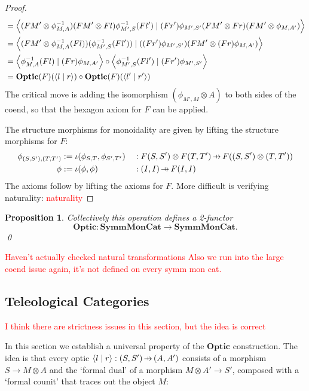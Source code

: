 \documentclass[11pt,letterpaper]{article}
\theoremstyle{plain}
\newtheorem{proposition}[theorem]{Proposition}
\theoremstyle{definition}
\newcommand{\SymmMonCat}{\mathbf{SymmMonCat}}
\newcommand{\Optic}{\mathbf{Optic}}
\newcommand{\rep}[2]{{\ensuremath \left\langle #1 \mid #2 \right\rangle}}
\newcommand{\hto}{\ensuremath{\,\mathaccent\shortmid\rightarrow\,}}
\newcommand{\todo}[1]{\textcolor{red}{\small #1}}
\begin{document}
\begin{proof}
\begin{align*}
&= \rep{(FM' \otimes \phi^{-1}_{M,A})(FM' \otimes Fl)\phi^{-1}_{M',S} (Fl')}{(Fr') \phi_{M',S'} (FM' \otimes Fr) (FM' \otimes \phi_{M,A'})} \\
&= \rep{(FM' \otimes \phi^{-1}_{M,A} (Fl))(\phi^{-1}_{M',S} (Fl'))}{((Fr') \phi_{M',S'})(FM' \otimes (Fr) \phi_{M,A'})} \\
&= \rep{\phi^{-1}_{M,A} (Fl)}{(Fr) \phi_{M,A'}} \circ \rep{\phi^{-1}_{M',S} (Fl')}{(Fr') \phi_{M',S'}} \\
&= \Optic(F)(\rep{l}{r}) \circ \Optic(F)(\rep{l'}{r'})
\end{align*}
The critical move is adding the isomorphism $(\phi_{M', M} \otimes A)$ to both sides of the coend, so that the hexagon axiom for $F$ can be applied.

The structure morphisms for monoidality are given by lifting the structure morphisms for $F$:
\begin{align*}
\phi_{(S, S'), (T, T')} &:= \iota(\phi_{S, T}, \phi_{S', T'}) &&: F(S, S') \otimes F(T, T') \hto F((S, S') \otimes (T, T')) \\
\phi &:= \iota(\phi, \phi) &&: (I, I) \hto F(I, I)
\end{align*}
The axioms follow by lifting the axioms for $F$. More difficult is verifying naturality: \todo{naturality}
\end{proof}

\begin{proposition}\label{prop:optic-functor}
  Collectively this operation defines a 2-functor \[\Optic : \SymmMonCat \to \SymmMonCat.\] \qed
\end{proposition}
\todo{Haven't actually checked natural transformations}
\todo{Also we run into the large coend issue again, it's not defined on every symm mon cat.}

\subsection{Teleological Categories}\label{sec:teleological-categories}
\todo{I think there are strictness issues in this section, but the idea is correct}

In this section we establish a universal property of the $\Optic$ construction. The idea is that every optic $\rep{l}{r} : (S, S') \hto (A, A')$ consists of a morphism $S \to M \otimes A$ and the `formal dual' of a morphism $M \otimes A' \to S'$, composed with a `formal counit' that traces out the object $M$:
\begin{center}
  
\end{center}
\end{document}
